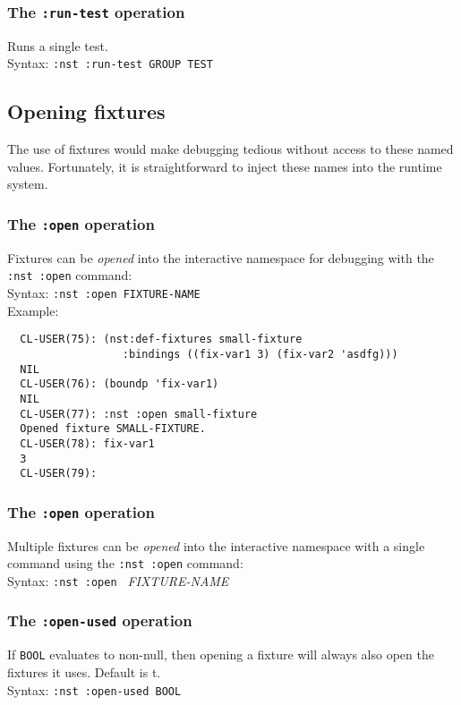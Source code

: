 \subsubsection{The \texttt{:run-test} operation}
%
Runs a single test.
\\ Syntax: \texttt{:nst :run-test GROUP TEST}

\subsection{Opening fixtures}
The use of fixtures would make debugging tedious without access to
these named values.  Fortunately, it is straightforward to inject
these names into the runtime system.

\subsubsection{The \texttt{:open} operation}
%
Fixtures can be \emph{opened} into the
interactive namespace for debugging with the
\texttt{:nst~:open} command:
\\ Syntax: \texttt{:nst :open FIXTURE-NAME}
\\ Example:
\begin{verbatim}
  CL-USER(75): (nst:def-fixtures small-fixture
                  :bindings ((fix-var1 3) (fix-var2 'asdfg)))
  NIL
  CL-USER(76): (boundp 'fix-var1)
  NIL
  CL-USER(77): :nst :open small-fixture
  Opened fixture SMALL-FIXTURE.
  CL-USER(78): fix-var1
  3
  CL-USER(79): 
\end{verbatim}

\subsubsection{The \texttt{:open{\textasteriskcentered}} operation}
%
Multiple fixtures can be \emph{opened} into the
interactive namespace with a single command using the
\texttt{:nst~:open} command:
\\ Syntax: \texttt{:nst :open\* } {\textit{FIXTURE-NAME}{\textasteriskcentered}}


\subsubsection{The \texttt{:open-used} operation}
%
If \texttt{BOOL} evaluates to non-null, then opening a fixture will
always also open the fixtures it uses.  Default is t.
\\ Syntax: \texttt{:nst :open-used BOOL}

